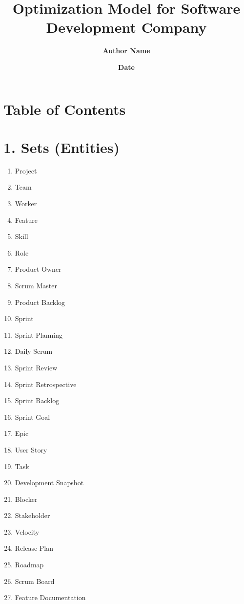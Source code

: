 \documentclass{article}
\title{\textbf{Optimization Model for Software Development Company}}
\author{\textbf{Author Name}}
\date{\textbf{Date}}
\begin{document}
\maketitle

\section*{Table of Contents}
\toc

\section{1. Sets (Entities)}
\begin{enumerate}
    \item Project
    \item Team
    \item Worker
    \item Feature
    \item Skill
    \item Role
    \item Product Owner
    \item Scrum Master
    \item Product Backlog
    \item Sprint
    \item Sprint Planning
    \item Daily Scrum
    \item Sprint Review
    \item Sprint Retrospective
    \item Sprint Backlog
    \item Sprint Goal
    \item Epic
    \item User Story
    \item Task
    \item Development Snapshot
    \item Blocker
    \item Stakeholder
    \item Velocity
    \item Release Plan
    \item Roadmap
    \item Scrum Board
    \item Feature Documentation
\end{enumerate}
\end{document}
